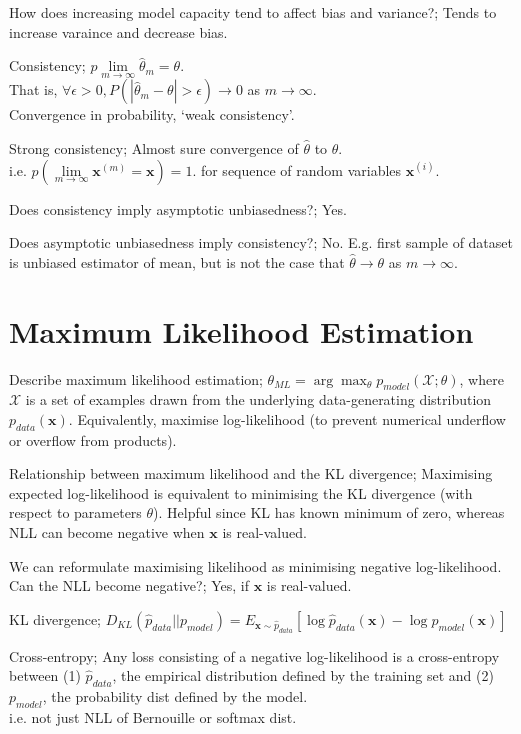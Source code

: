 \documentclass{article}
\begin{document}
How does increasing model capacity tend to affect bias and variance?; Tends to increase varaince and decrease bias.

Consistency; $p\lim\limits_{m\rightarrow\infty}\hat{\theta}_m = \theta$. \\ That is, $\forall \epsilon > 0, P(|\hat{\theta}_m-\theta|>\epsilon)\rightarrow 0$ as $m\rightarrow\infty$. \\ Convergence in probability, `weak consistency'.

Strong consistency; Almost sure convergence of $\hat{\theta}$ to $\theta$. \\ i.e. $p(\lim\limits_{m\rightarrow\infty}\mathbf{x}^{(m)}=\mathbf{x})=1$. for sequence of random variables $\mathbf{x}^{(i)}$.

Does consistency imply asymptotic unbiasedness?; Yes.

Does asymptotic unbiasedness imply consistency?; No. E.g. first sample of dataset is unbiased estimator of mean, but is not the case that $\hat{\theta}\rightarrow\theta$ as $m\rightarrow\infty$.

\section{Maximum Likelihood Estimation}

Describe maximum likelihood estimation; $\theta_{ML} = \arg\max_{\theta} p_{model}(\mathcal{X};\theta)$, where $\mathcal{X}$ is a set of examples drawn from the underlying data-generating distribution $p_{data}(\mathbf{x})$. Equivalently, maximise log-likelihood (to prevent numerical underflow or overflow from products).

Relationship between maximum likelihood and the KL divergence; Maximising expected log-likelihood is equivalent to minimising the KL divergence (with respect to parameters $\theta$). Helpful since KL has known minimum of zero, whereas NLL can become negative when $\mathbf{x}$ is real-valued.

We can reformulate maximising likelihood as minimising negative log-likelihood. Can the NLL become negative?; Yes, if $\mathbf{x}$ is real-valued.

KL divergence; $D_{KL}(\hat{p}_{data}||p_{model}) = E_{\mathbf{x}\sim \hat{p}_{data}}[\log\hat{p}_{data}(\mathbf{x})-\log p_{model}(\mathbf{x})]$

Cross-entropy; Any loss consisting of a negative log-likelihood is a cross-entropy between (1) $\hat{p}_{data}$, the empirical distribution defined by the training set and (2) $p_{model}$, the probability dist defined by the model. \\ i.e. not just NLL of Bernouille or softmax dist.
\end{document}
